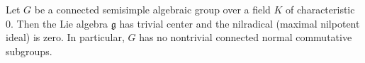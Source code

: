 Let $G$ be a connected semisimple algebraic group over a field $K$ of characteristic $0$. Then the Lie algebra $\mathfrak{g}$ has trivial center and the nilradical (maximal nilpotent ideal) is zero. In particular, $G$ has no nontrivial connected normal commutative subgroups.

